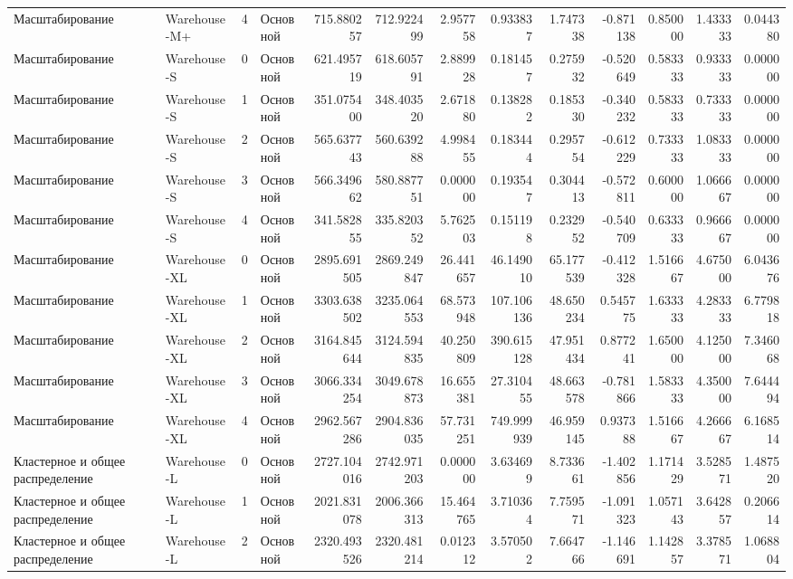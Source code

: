 \begin{tabular}{llrlrrrrrrrrr}
 Масштабирование & Warehouse-M+ & 4 & Основной & 715.880257 & 712.922499 & 2.957758 & 0.933837 & 1.747338 & -0.871138 & 0.850000 & 1.433333 & 0.044380 \\
 Масштабирование & Warehouse-S & 0 & Основной & 621.495719 & 618.605791 & 2.889928 & 0.181457 & 0.275932 & -0.520649 & 0.583333 & 0.933333 & 0.000000 \\
 Масштабирование & Warehouse-S & 1 & Основной & 351.075400 & 348.403520 & 2.671880 & 0.138282 & 0.185330 & -0.340232 & 0.583333 & 0.733333 & 0.000000 \\
 Масштабирование & Warehouse-S & 2 & Основной & 565.637743 & 560.639288 & 4.998455 & 0.183444 & 0.295754 & -0.612229 & 0.733333 & 1.083333 & 0.000000 \\
 Масштабирование & Warehouse-S & 3 & Основной & 566.349662 & 580.887751 & 0.000000 & 0.193547 & 0.304413 & -0.572811 & 0.600000 & 1.066667 & 0.000000 \\
 Масштабирование & Warehouse-S & 4 & Основной & 341.582855 & 335.820352 & 5.762503 & 0.151198 & 0.232952 & -0.540709 & 0.633333 & 0.966667 & 0.000000 \\
 Масштабирование & Warehouse-XL & 0 & Основной & 2895.691505 & 2869.249847 & 26.441657 & 46.149010 & 65.177539 & -0.412328 & 1.516667 & 4.675000 & 6.043676 \\
 Масштабирование & Warehouse-XL & 1 & Основной & 3303.638502 & 3235.064553 & 68.573948 & 107.106136 & 48.650234 & 0.545775 & 1.633333 & 4.283333 & 6.779818 \\
 Масштабирование & Warehouse-XL & 2 & Основной & 3164.845644 & 3124.594835 & 40.250809 & 390.615128 & 47.951434 & 0.877241 & 1.650000 & 4.125000 & 7.346068 \\
 Масштабирование & Warehouse-XL & 3 & Основной & 3066.334254 & 3049.678873 & 16.655381 & 27.310455 & 48.663578 & -0.781866 & 1.583333 & 4.350000 & 7.644494 \\
 Масштабирование & Warehouse-XL & 4 & Основной & 2962.567286 & 2904.836035 & 57.731251 & 749.999939 & 46.959145 & 0.937388 & 1.516667 & 4.266667 & 6.168514 \\
 Кластерное и общее распределение & Warehouse-L & 0 & Основной & 2727.104016 & 2742.971203 & 0.000000 & 3.634699 & 8.733661 & -1.402856 & 1.171429 & 3.528571 & 1.487520 \\
 Кластерное и общее распределение & Warehouse-L & 1 & Основной & 2021.831078 & 2006.366313 & 15.464765 & 3.710364 & 7.759571 & -1.091323 & 1.057143 & 3.642857 & 0.206614 \\
 Кластерное и общее распределение & Warehouse-L & 2 & Основной & 2320.493526 & 2320.481214 & 0.012312 & 3.570502 & 7.664766 & -1.146691 & 1.142857 & 3.378571 & 1.068804 \\

\end{tabular}
